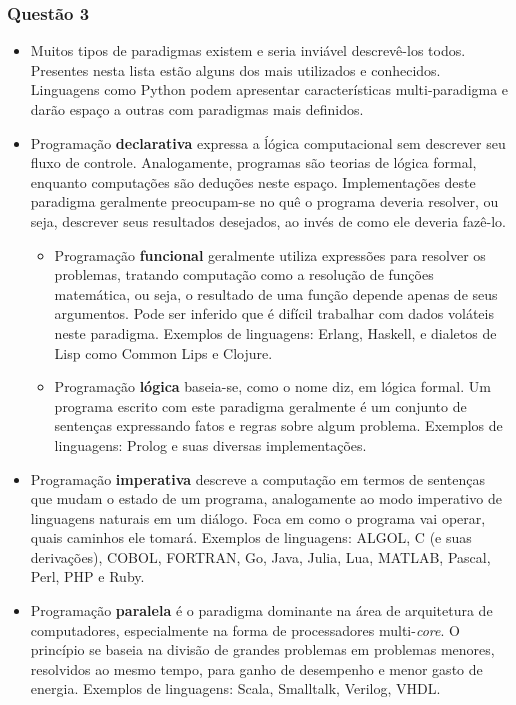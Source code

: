 \documentclass{article}
\begin{document}
\subsubsection*{Questão 3}
\begin{itemize}
    \item Muitos tipos de paradigmas existem e seria inviável descrevê-los todos. Presentes nesta lista estão alguns dos mais utilizados e conhecidos. Linguagens como Python podem apresentar características multi-paradigma e darão espaço a outras com paradigmas mais definidos.

    \item Programação \textbf{declarativa} expressa a ĺógica computacional sem descrever seu fluxo de controle. Analogamente, programas são teorias de lógica formal, enquanto computações são deduções neste espaço. Implementações deste paradigma geralmente preocupam-se no quê o programa deveria resolver, ou seja, descrever seus resultados desejados, ao invés de como ele deveria fazê-lo.

    \begin{itemize}
        \item Programação \textbf{funcional} geralmente utiliza expressões para resolver os problemas, tratando computação como a resolução de funções matemática, ou seja, o resultado de uma função depende apenas de seus argumentos. Pode ser inferido que é difícil trabalhar com dados voláteis neste paradigma. Exemplos de linguagens: Erlang, Haskell, e dialetos de Lisp como Common Lips e Clojure.

        \item Programação \textbf{lógica} baseia-se, como o nome diz, em lógica formal. Um programa escrito com este paradigma geralmente é um conjunto de sentenças expressando fatos e regras sobre algum problema. Exemplos de linguagens: Prolog e suas diversas implementações.
    \end{itemize}

    \item Programação \textbf{imperativa} descreve a computação em termos de sentenças que mudam o estado de um programa, analogamente ao modo imperativo de linguagens naturais em um diálogo. Foca em como o programa vai operar, quais caminhos ele tomará. Exemplos de linguagens: ALGOL, C (e suas derivações), COBOL, FORTRAN, Go, Java, Julia, Lua, MATLAB, Pascal, Perl, PHP e Ruby.

    \item Programação \textbf{paralela} é o paradigma dominante na área de arquitetura de computadores, especialmente na forma de processadores multi-\textit{core}. O princípio se baseia na divisão de grandes problemas em problemas menores, resolvidos ao mesmo tempo, para ganho de desempenho e menor gasto de energia. Exemplos de linguagens: Scala, Smalltalk, Verilog, VHDL.


\end{itemize}
\end{document}
